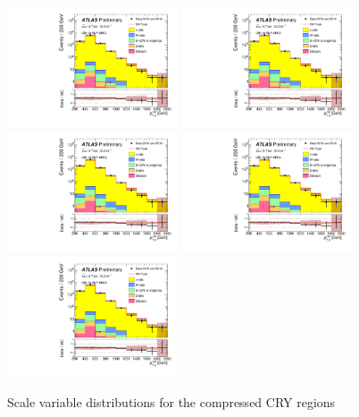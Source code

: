 \begin{figure}[tbp]
\begin{center}
\includegraphics[width=0.45\textwidth]{figures/ATLAS-CONF-2016-078_INT/N-1Plots/AtlasStyle/Preliminary/CRY_SRJigsawSRC1_LastCut_CRY_minusone}
\includegraphics[width=0.45\textwidth]{figures/ATLAS-CONF-2016-078_INT/N-1Plots/AtlasStyle/Preliminary/CRY_SRJigsawSRC2_LastCut_CRY_minusone}
\includegraphics[width=0.45\textwidth]{figures/ATLAS-CONF-2016-078_INT/N-1Plots/AtlasStyle/Preliminary/CRY_SRJigsawSRC3_LastCut_CRY_minusone}
\includegraphics[width=0.45\textwidth]{figures/ATLAS-CONF-2016-078_INT/N-1Plots/AtlasStyle/Preliminary/CRY_SRJigsawSRC4_LastCut_CRY_minusone}
\includegraphics[width=0.45\textwidth]{figures/ATLAS-CONF-2016-078_INT/N-1Plots/AtlasStyle/Preliminary/CRY_SRJigsawSRC5_LastCut_CRY_minusone}
\end{center}
\caption{Scale variable distributions for the compressed CRY regions}
\label{fig:CRY_SRJigsawSRC1_LastCut_CRY_minusone}
\end{figure}

